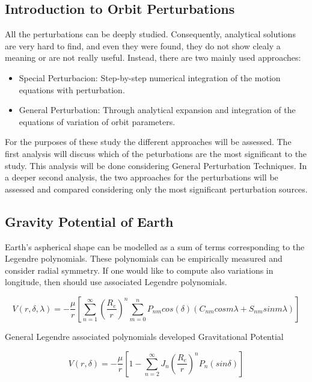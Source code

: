 \subsection{Introduction to Orbit Perturbations \cite{Vallado2007}}
\label{TypesPerturb}

All the perturbations can be deeply studied.  Consequently, analytical solutions are very hard to find, and even they were found, they do not show clealy a meaning or are not really useful. Instead, there are two mainly used approaches:
\begin{itemize}
\item Special Perturbacion: Step-by-step numerical integration of the motion equations with perturbation.
\item General Perturbation: Through analytical expansion and integration of the equations of variation of orbit parameters.
\end{itemize}

For the purposes of these study the different approaches will be assessed. The first analysis will discuss which of the peturbations are the most significant to the study. This analysis will be done considering General Perturbation Techniques. In a deeper second analysis, the two approaches for the perturbations will be assessed and compared considering only the most significant perturbation sources.

\subsection{Gravity Potential of Earth}
Earth's aspherical shape can be modelled as a sum of terms corresponding to the Legendre polynomials. These polynomials can be empirically measured and consider radial symmetry. If one would like to compute also variations in longitude, then should use associated Legendre polynomials.

\begin{equation}
V(r,\delta,\lambda) = -\frac{\mu}{r} \left [\sum_{n=1}^{\infty }\left  ( \frac{R_{e}}{r} \right ) ^{n} \sum_{m=0}^{n}P_{nm} cos(\delta )(C_{nm}cos m\lambda + S_{nm}sin m\lambda)  \right ]
\label{eq:Oblat}
\end{equation}

General Legendre associated polynomials developed Gravitational Potential

\begin{equation}
V(r,\delta) = -\frac{\mu}{r} \left [1-\sum_{n=2}^{\infty}   J_{n}\left( \frac{R_{e}}{r}\right) ^{n} P_{n} (sin\delta)  \right ]
\end{equation}

